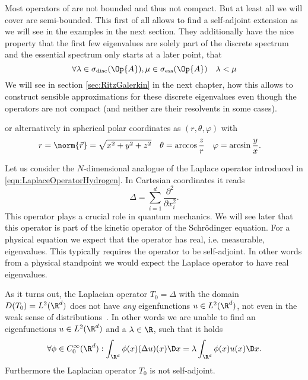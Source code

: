 Most operators of \QM are not bounded and thus not compact.
But at least all we will cover are semi-bounded.
This first of all allows to find a self-adjoint extension as we will see in the examples
in the next section.
They additionally have the nice property that the first few eigenvalues are
solely part of the discrete spectrum and the essential spectrum only starts at a
later point, \ie that
\[ \forall \lambda \in \sigma_{\text{disc}}(\Op{A}),
    \mu \in \sigma_{\text{ess}}(\Op{A}) \quad \lambda < \mu \]
We will see in section \vref{sec:RitzGalerkin} in the next chapter,
how this allows to construct sensible approximations
for these discrete eigenvalues even though the operators are not compact
(and neither are their resolvents in some cases).



or alternatively in spherical polar coordinates
as $(r, \theta, \varphi)$ with
\begin{align*}
	r &= \norm{\vec{r}} = \sqrt{x^2+y^2+z^2} & \theta &= \arccos\frac{z}{r} & \varphi &= \arcsin\frac{y}{x}.
\end{align*}




Let us consider the $N$-dimensional analogue of the Laplace operator
introduced in \eqref{eqn:LaplaceOperatorHydrogen}.
In Cartesian coordinates it reads
\[ \Delta = \sum_{i=1}^d \frac{\partial^2}{\partial x_i^2}. \]
This operator plays a crucial role in quantum mechanics.
We will see later that this operator is part of the
kinetic operator of the Schrödinger equation.
For a physical equation we expect that the operator has
real, i.e. measurable, eigenvalues.
This typically requires the operator to be self-adjoint.
In other words from a physical standpoint we would expect
the Laplace operator to have real eigenvalues.

As it turns out,
the Laplacian operator $T_0 = \Delta$ with the domain $D(T_0) = L^2(\R^d)$
does not have \emph{any}
eigenfunctions $u \in L^2(\R^d)$,
not even in the weak sense of distributions~\cite{Helffer2013}.
In other words we are unable to find an eigenfunctions $u \in L^2(\R^d)$
and a $\lambda \in \R$,
such that it holds
\[ \forall \phi \in C^\infty_0(\R^d):  \int_{\R^d}\phi(x) (\Delta u)(x) \D x = \lambda \int_{\R^d} \phi(x) u(x) \D x. \]
Furthermore the Laplacian operator $T_0$ is not self-adjoint.

